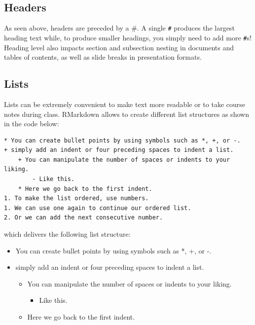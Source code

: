 \documentclass[12pt,]{krantz}
\providecommand{\tightlist}{%
  \setlength{\itemsep}{0pt}\setlength{\parskip}{0pt}}
\begin{document}
\subsection{Headers}\label{headers}

As seen above, headers are preceded by a \#. A single \texttt{\#}
produces the largest heading text while, to produce smaller headings,
you simply need to add more \texttt{\#}s! Heading level also impacts
section and subsection nesting in documents and tables of contents, as
well as slide breaks in presentation formats.

\subsection{Lists}\label{lists}

Lists can be extremely convenient to make text more readable or to take
course notes during class. RMarkdown allows to create different list
structures as shown in the code below:

\begin{verbatim}
* You can create bullet points by using symbols such as *, +, or -. 
+ simply add an indent or four preceding spaces to indent a list. 
    + You can manipulate the number of spaces or indents to your liking. 
        - Like this. 
    * Here we go back to the first indent. 
1. To make the list ordered, use numbers. 
1. We can use one again to continue our ordered list. 
2. Or we can add the next consecutive number. 
\end{verbatim}

which delivers the following list structure:

\begin{itemize}
\tightlist
\item
  You can create bullet points by using symbols such as *, +, or -.
\item
  simply add an indent or four preceding spaces to indent a list.

  \begin{itemize}
  \tightlist
  \item
    You can manipulate the number of spaces or indents to your liking.

    \begin{itemize}
    \tightlist
    \item
      Like this.
    \end{itemize}
  \item
    Here we go back to the first indent.
  \end{itemize}
\end{itemize}
\end{document}
